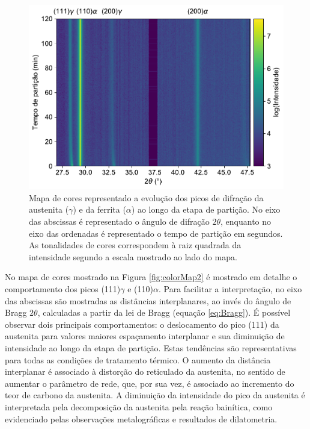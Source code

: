 \begin{figure}
  \includegraphics[width=.9\textwidth]{img/XTMS/XTMS_colormap_full.pdf}
  \caption{Mapa de cores representado a evolução dos picos de difração da austenita ($\gamma$) e da ferrita ($\alpha$) ao longo da etapa de partição. No eixo das abscissas é representado o ângulo de difração $2\theta$, enquanto no eixo das ordenadas é representado o tempo de partição em segundos. As tonalidades de cores correspondem à raiz quadrada da intensidade segundo a escala mostrado ao lado do mapa.}
  \label{fig:colorMap}
\end{figure}

No mapa de cores mostrado na Figura \ref{fig:colorMap2} é mostrado em detalhe o comportamento dos picos (111)$\gamma$ e (110)$\alpha$. Para facilitar a interpretação, no eixo das abscissas são mostradas as distâncias interplanares, ao invés do ângulo de Bragg $2\theta$, calculadas a partir da lei de Bragg (equação \ref{eq:Bragg}). É possível observar dois principais comportamentos: o deslocamento do pico (111) da austenita para valores maiores espaçamento interplanar e sua diminuição de intensidade ao longo da etapa de partição. Estas tendências são representativas para todas as condições de tratamento térmico. O aumento da distância interplanar é associado à distorção do reticulado da austenita, no sentido de aumentar o parâmetro de rede, que, por sua vez, é associado ao incremento do teor de carbono da austenita. A diminuição da intensidade do pico da austenita é interpretada pela decomposição da austenita pela reação bainítica, como evidenciado pelas observações metalográficas e resultados de dilatometria.

